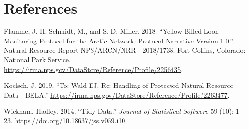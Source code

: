 \documentclass[
  letterpaper,
  DIV=11,
  numbers=noendperiod]{scrreprt}
\newlength{\cslhangindent}
\newenvironment{CSLReferences}[2] %
 {\begin{list}{}{%
  \setlength{\itemindent}{0pt}
  \setlength{\leftmargin}{0pt}
  \setlength{\parsep}{0pt}
  \ifodd #1
   \setlength{\leftmargin}{\cslhangindent}
   \setlength{\itemindent}{-1\cslhangindent}
  \fi
  \setlength{\itemsep}{#2\baselineskip}}}
 {\end{list}}
\begin{document}

\chapter*{References}\label{references}


\label{refs}
\begin{CSLReferences}{1}{0}
Flamme, J. H. Schmidt, M., and S. D. Miller. 2018. {``Yellow-Billed Loon
Monitoring Protocol for the Arctic Network: Protocol Narrative Version
1.0.''} Natural Resource Report NPS/ARCN/NRR---2018/1738. Fort Collins,
Colorado: National Park Service.
\url{https://irma.nps.gov/DataStore/Reference/Profile/2256435}.

Koelsch, J. 2019. {``To: Wald EJ. Re: Handling of Protected Natural
Resource Data - BELA.''}
\url{https://irma.nps.gov/DataStore/Reference/Profile/2263477}.

Wickham, Hadley. 2014. {``Tidy Data.''} \emph{Journal of Statistical
Software} 59 (10): 1--23. \url{https://doi.org/10.18637/jss.v059.i10}.

\end{CSLReferences}
\end{document}
